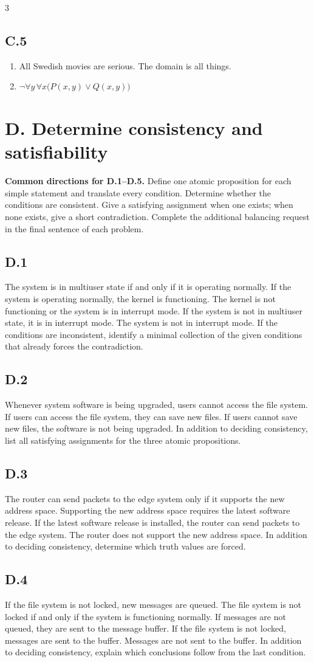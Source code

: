 \documentclass{article}
\newcommand{\problem}[1]{%
  \par
  \subsection*{#1}%
}
\begin{document}
\begin{multicols}{3}
\problem{C.5}
\begin{enumerate}[label=(\alph*)]
  \item All Swedish movies are serious. The domain is all things.
  \item $\neg\forall y\,\forall x\bigl(P(x,y)\lor Q(x,y)\bigr)$
\end{enumerate}
\section*{D. Determine consistency and satisfiability}

\textbf{Common directions for D.1--D.5.} Define one atomic proposition for
each simple statement and translate every condition. Determine whether the
conditions are consistent. Give a satisfying assignment when one exists; when
none exists, give a short contradiction. Complete the additional balancing
request in the final sentence of each problem.

\problem{D.1}
The system is in multiuser state if and only if it is operating normally. If
the system is operating normally, the kernel is functioning. The kernel is not
functioning or the system is in interrupt mode. If the system is not in
multiuser state, it is in interrupt mode. The system is not in interrupt mode.
If the conditions are inconsistent, identify a minimal collection of the given
conditions that already forces the contradiction.

\problem{D.2}
Whenever system software is being upgraded, users cannot access the file
system. If users can access the file system, they can save new files. If users
cannot save new files, the software is not being upgraded. In addition to
deciding consistency, list all satisfying assignments for the three atomic
propositions.

\columnbreak
\problem{D.3}
The router can send packets to the edge system only if it supports the new
address space. Supporting the new address space requires the latest software
release. If the latest software release is installed, the router can send
packets to the edge system. The router does not support the new address space.
In addition to deciding consistency, determine which truth values are forced.

\problem{D.4}
If the file system is not locked, new messages are queued. The file system is
not locked if and only if the system is functioning normally. If messages are
not queued, they are sent to the message buffer. If the file system is not
locked, messages are sent to the buffer. Messages are not sent to the buffer.
In addition to deciding consistency, explain which conclusions follow from the
last condition.


\end{multicols}
\end{document}
